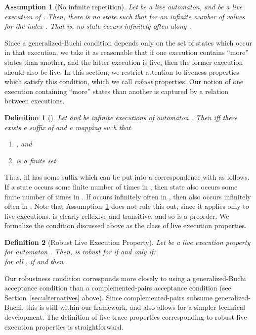 \documentclass[11pt]{article}
\newcommand{\bn}{\begin{enumerate}}
\newcommand{\en}{\end{enumerate}}
\newcommand{\bd}{\begin{definition}}
\newcommand{\ed}{\end{definition}}
\newtheorem{definition}{Definition}
\newtheorem{assumption}{Assumption}
\begin{document}
\begin{assumption}[No infinite repetition]
\label{ass:no-infinite-repetition}
Let  be a live automaton, and
 be a live execution of . Then, there
is no state  such that  for an infinite number of values
for the index .  
That is, no state occurs infinitely often along .
\end{assumption}
 

Since a generalized-Buchi condition depends only on the set of states
which occur in that execution, we take it as reasonable that if one
execution contains ``more'' states than another, and the latter
execution is live, then the former execution should also be live. 
In this section, we restrict attention to liveness properties which
satisfy this condition, which we call \emph{robust} properties.
Our notion of one execution containing ``more'' states than another 
is captured by a relation  between executions.

\bd[]
\label{def:subsumption}
Let  and  be infinite executions of automaton .
Then  iff there exists a suffix  of  
and a mapping  such that 
\bn
\item , and 
\item  is a finite set.
\en
\ed

Thus,  iff  has some suffix  which can be
put into a correspondence with  as follows. If a state 
occurs some finite  number of times in , 
then state  also occurs some finite number of times in .
If  occurs infinitely often in , then  also occurs
infinitely often in . Note that Assumption~\ref{ass:no-infinite-repetition}
does not rule this out, since it applies only to live executions.
 is clearly reflexive and transitive, and so is a preorder.
We formalize the condition discussed above as the class of 
 live execution properties.

\bd[Robust Live Execution Property]
\label{def:robust-live-execution-property}
Let  be a live execution property for automaton .
Then,  is \emph{robust for } if and only if:\\
\ind for all , 
       if  and  then .
\ed

Our robustness condition corresponds more closely to using a
generalized-Buchi acceptance condition than a complemented-pairs
acceptance condition (see Section~\ref{sec:alternatives} above). Since
complemented-pairs subsume generalized-Buchi, this is still within our
framework, and also allows for a simpler technical development.
The definition of live trace properties corresponding to robust live
execution properties is straightforward.
\end{document}
